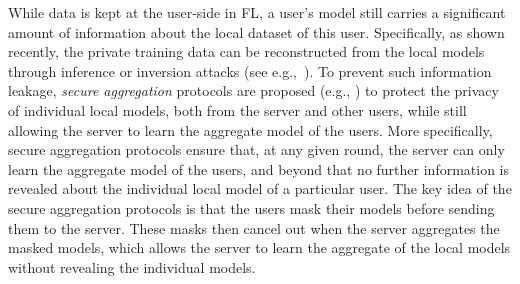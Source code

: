 While data is kept at the user-side in FL, a user's model still carries a significant amount of information about the local dataset of this user. Specifically, as shown recently, the private training data can be reconstructed from the local models through inference or inversion attacks (see e.g.,~\cite{fredrikson2015model,nasr2019comprehensive,zhu2020deep,geiping2020inverting}). To prevent such information leakage, \textit{secure aggregation} protocols are proposed (e.g., \cite{bonawitz2017practical,so2021turbo,kadhe2020fastsecagg,zhao2021information,bell2020secure}) to protect the privacy of individual local models, both from the server and other users, while still allowing the server to learn the aggregate model of the users. 
More specifically, secure aggregation protocols ensure that, at any given round, the server can only learn the aggregate model of the users, and beyond that no further information is revealed about the individual local model of a particular user. The key idea of the secure aggregation protocols is that the users mask their models before sending them to the server.  These masks then cancel out when the server aggregates the masked models, which allows the server to learn the aggregate of the local models without revealing the individual models.  

